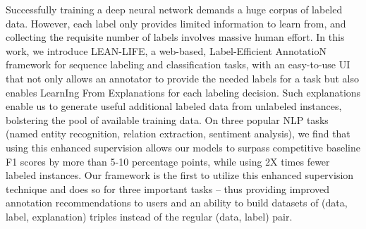 Successfully training a deep neural network demands a huge corpus of labeled data. However, each label only provides limited information to learn from, and collecting the requisite number of labels involves massive human effort. In this work, we introduce LEAN-LIFE, a web-based, Label-Efficient AnnotatioN framework for sequence labeling and classification tasks, with an easy-to-use UI that not only allows an annotator to provide the needed labels for a task but also enables LearnIng From Explanations for each labeling decision. Such explanations enable us to generate useful additional labeled data from unlabeled instances, bolstering the pool of available training data. On three popular NLP tasks (named entity recognition, relation extraction, sentiment analysis), we find that using this enhanced supervision allows our models to surpass competitive baseline F1 scores by more than 5-10 percentage points, while using 2X times fewer labeled instances. Our framework is the first to utilize this enhanced supervision technique and does so for three important tasks -- thus providing improved annotation recommendations to users and an ability to build datasets of (data, label, explanation) triples instead of the regular (data, label) pair.
